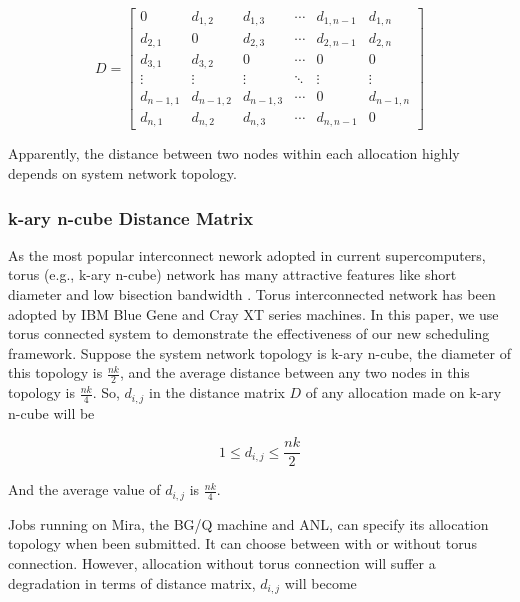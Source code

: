 \documentclass[conference]{IEEEtran}
\begin{document}
\begin{displaymath}
 D = \begin{bmatrix}
  0 & d_{1,2} & d_{1,3} & \cdots & d_{1,n-1} & d_{1,n}\\
  d_{2,1} & 0 & d_{2,3} &\cdots & d_{2,n-1}  & d_{2,n}\\
  d_{3,1} & d_{3,2} & 0 &\cdots & 0  & 0\\
  \vdots  & \vdots & \vdots & \ddots & \vdots & \vdots \\
  d_{n-1,1} & d_{n-1,2} & d_{n-1,3} & \cdots & 0 & d_{n-1,n}\\
  d_{n,1} & d_{n,2} & d_{n,3} & \cdots & d_{n,n-1} & 0
 \end{bmatrix} 
\end{displaymath}

Apparently, the distance between two nodes within each allocation highly depends on system network topology.\\

\subsubsection{k-ary n-cube Distance Matrix}
\label{sec:k-ary n-cube distance matrix}

As the most popular interconnect nework adopted in current supercomputers, torus (e.g., k-ary n-cube) network has many attractive features like short diameter and low bisection bandwidth \cite{zhou-ipdps}. Torus interconnected network has been adopted by IBM Blue Gene and Cray XT series machines\cite{Dong-SC11}. In this paper, we use torus connected system to demonstrate the effectiveness of our new scheduling framework. Suppose the system network topology is k-ary n-cube,  the diameter of this topology is $\frac{nk}{2}$, and the average distance between any two nodes in this topology is $\frac{nk}{4}$. So, $d_{i,j}$ in the distance matrix $D$ of any allocation made on k-ary n-cube will be

\begin{equation}
1\leq d_{i,j}\leq \frac{nk}{2}
\end{equation}

And the average value of $d_{i,j}$ is $\frac{nk}{4}$.

Jobs running on Mira, the BG/Q machine and ANL, can specify its allocation topology when been submitted. It can choose between with or without torus connection. However, allocation without torus connection will suffer a degradation in terms of distance matrix, $d_{i,j}$ will become
\end{document}
